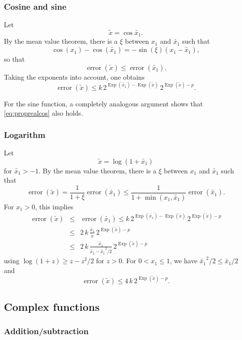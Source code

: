 \documentclass [11pt]{article}
\newcommand {\appro}[1]{\widetilde {#1}}
\DeclareMathOperator{\Exp}{\operatorname {Exp}}
\newcommand{\error}{\operatorname {error}}
\renewcommand {\leq}{\leqslant}
\renewcommand {\geq}{\geqslant}
\begin{document}
\subsubsection {Cosine and sine}
\label {sssec:proprealcossin}

Let
\[
\appro x = \cos {\appro {x_1}}.
\]
By the mean value theorem, there is a $\xi$ between $x_1$ and $\appro {x_1}$
such that
\[
\cos (x_1) - \cos (\appro {x_1}) = -\sin (\xi) (x_1 - \appro {x_1}),
\]
so that
\[
\error (\appro x)
\leq \error (\appro {x_1}).
\]
Taking the exponents into account, one obtains
\begin {equation}
\label {eq:proprealcos}
\error (\appro x)
\leq
k \, 2^{\Exp (\appro {x_1}) - \Exp (\appro x)}
\, 2^{\Exp (\appro x) - p}.
\end {equation}

For the sine function, a completely analogous argument shows that
\eqref {eq:proprealcos} also holds.


\subsubsection {Logarithm}
\label {sssec:propreallog}

Let
\[
\appro x = \log (1 + \appro {x_1})
\]
for $\appro {x_1} > -1$.
By the mean value theorem, there is a $\xi$ between $x_1$ and $\appro {x_1}$
such that
\[
\error (\appro x) = \frac {1}{1 + \xi} \error (\appro {x_1})
\leq \frac {1}{1 + \min (x_1, \appro {x_1})} \error (\appro {x_1}).
\]
For $x_1 > 0$, this implies
\begin {eqnarray*}
\error (\appro x)
& \leq & \error (\appro {x_1})
\leq
k \, 2^{\Exp (\appro {x_1}) - \Exp (\appro x)}
\, 2^{\Exp (\appro x) - p} \\
& \leq & 2 \, k \, \frac {\appro {x_1}}{\appro x} \, 2^{\Exp (\appro x) - p} \\
& \leq & 2 \, k \, \frac {\appro {x_1}}{\appro {x_1} - \appro {x_1}^2/2}
\, 2^{\Exp (\appro x) - p}
\end {eqnarray*}
using $\log (1 + z) \geq z - z^2/2$ for $z > 0$.
For $0 < x_1 \leq 1$, we have $\appro {x_1}^2/2 \leq \appro {x_1}/2$ and
\[
\error (\appro x)
\leq 4 \, k \, 2^{\Exp (\appro x) - p}.
\]


\subsection {Complex functions}

\subsubsection {Addition/subtraction}
\label {sssec:propadd}
\end{document}

